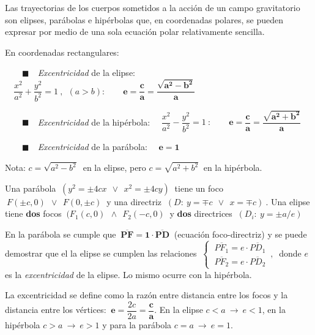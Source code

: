 
\normalsize{Las} trayectorias de los cuerpos sometidos a la acción de un campo gravitatorio son elipses, parábolas e hipérbolas que, en coordenadas polares, se pueden expresar por medio de una sola ecuación polar relativamente sencilla.

\vspace{5mm}

En coordenadas rectangulares:
\vspace{-3mm}
\begin{cuadro-naranja}
\tiny{$\qquad \blacksquare \quad $}\normalsize{\emph{Excentricidad}} de la elipse: $\quad \dfrac {x^2}{a^2}+\dfrac{y^2}{b^2}=1 \ , \ \ (a>b):\qquad \boldsymbol{ e=\dfrac c a = \dfrac{\sqrt{a^2-b^2}}{a} }$

\tiny{$\qquad \blacksquare \quad $}\normalsize{\emph{Excentricidad}} de la hipérbola: $\quad \dfrac {x^2}{a^2}-\dfrac{y^2}{b^2}=1 \ : \qquad \boldsymbol{ e=\dfrac c a = \dfrac{\sqrt{a^2+b^2}}{a} }$

\tiny{$\qquad \blacksquare \quad $}\normalsize{\emph{Excentricidad}} de la parábola: $ \quad \boldsymbol{ e=1 }$	
\end{cuadro-naranja}

\textcolor{gris}{Nota: \hspace{1cm} $c=\sqrt{a^2-b^2} \ $ en la elipse, pero $c=\sqrt{a^2+b^2} \ $ en la hipérbola.}

\vspace{5mm}

Una parábola $ \ (y^2=\pm 4cx \ \ \vee \ \ x^2=\pm 4cy ) \ $ tiene un foco $\ F(\pm c, 0 ) \ \ \vee \ \ F(0,\pm c) \  $ y una directriz $ \ ( D:\ y=\mp c \ \ \vee \ \ x=\mp c )\ $.
Una elipse tiene \textbf{dos} focos $\ ( F_1(c,0) \ \ \wedge \ \ F_2(-c,0) \ $ y \textbf{dos} directrices $\ (D_i:\ y=\pm a/e) $

En la parábola se cumple que $\ \boldsymbol {\overline{PF}=1\cdot \overline{PD} } \ $ (\textsf{ecuación foco-directriz}) y se puede demostrar que el la elipse se cumplen las relaciones $ \ \begin{cases} \ \overline{PF_1}=e\cdot \overline{PD_1} \\ \ \overline{PF_2}=e\cdot \overline{PD_2} \end{cases}\, , \ $ donde $e$ es la \emph{excentricidad} de la elipse. Lo mismo ocurre con la hipérbola.

La excentricidad se define como la razón entre distancia entre los focos y la distancia entre los vértices: $\ \boldsymbol e=\dfrac{2c}{2a}= \boldsymbol{ \dfrac c a}$. En la elipse $c<a \ \to \ e<1$, en la hipérbola $c>a \ \to \ e>1$ y para la parábola $c=a \ \to \ e=1$.

